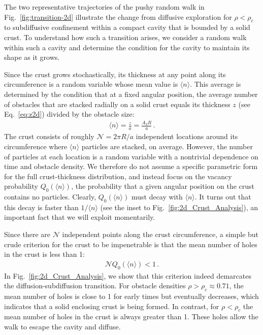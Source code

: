 \documentclass[reprint,superscriptaddress]{revtex4-2}
\begin{document}
The two representative trajectories of the pushy random walk in Fig.~\ref{fig:transition-2d} illustrate the change from diffusive exploration for $\rho<\rho_c$ to subdiffusive confinement within a compact cavity that is bounded by a solid crust. To understand how such a transition arises, we consider a random walk within such a cavity and determine the condition for the cavity to maintain its shape as it grows.

Since the crust grows stochastically, its thickness at any point along its circumference is a random variable whose mean value is $\langle n\rangle$. This average is determined by the condition that at a fixed angular position, the average number of obstacles that are stacked radially on a solid crust equals its thickness $z$ (see Eq.~\eqref{eq:z2d}) divided by the obstacle size:
\begin{align}
  \label{n}
  \langle  n\rangle =\frac{z}{a}=\frac{A_2 R}{a}\,.
\end{align}
The crust consists of roughly $\mathcal{N}=2\pi R/a$ independent locations around its circumference where $\langle n\rangle$ particles are stacked, on average.  However, the number of particles at each location is a random variable with a nontrivial dependence on time and obstacle density. We therefore do not assume a specific parametric form for the full crust-thickness distribution, and instead focus on the vacancy probability $Q_0(\langle n\rangle)$, the probability that a given angular position on the crust contains no particles. Clearly, $Q_0(\langle n\rangle)$ must decay with $\langle n\rangle$.  It turns out that this decay is faster than $1/\langle n\rangle$ (see the inset to Fig.~\ref{fig:2d_Crust_Analysis}), an important fact that we will exploit momentarily.

Since there are $\mathcal{N}$ independent points along the crust circumference, a simple but crude criterion for the crust to be impenetrable is that the mean number of holes in the crust is less than 1:
\begin{align}
\label{criterion}
\mathcal{N} Q_0(\langle n\rangle) < 1\,.
\end{align}
In Fig.~\ref{fig:2d_Crust_Analysis}, we show that this criterion indeed demarcates the diffusion-subdiffusion transition. For obstacle densities $\rho > \rho_c\approx 0.71$, the mean number of holes is close to 1 for early times but eventually decreases, which indicates that a solid enclosing crust is being formed. In contrast, for $\rho<\rho_c$ the mean number of holes in the crust is always greater than 1.  These holes allow the walk to escape the cavity and diffuse.
\end{document}
